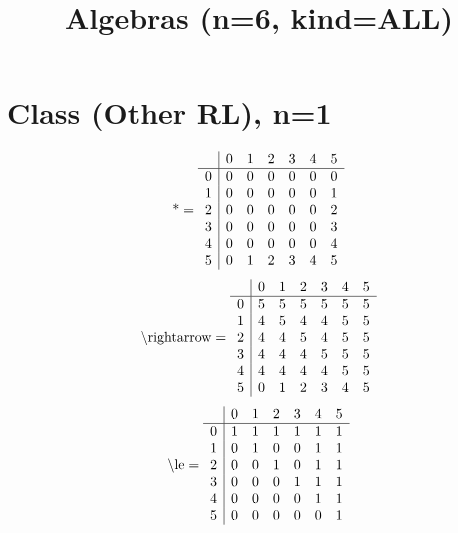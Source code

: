 \documentclass[11pt]{article}
\title{Algebras (n=6, kind=ALL)}
\date{}
\begin{document}
\maketitle
\tableofcontents
\section{Class (Other RL), n=1}
\[\text{*} = 
\begin{array}{r | r r r r r r}
 & 0 & 1 & 2 & 3 & 4 & 5 \\ \hline
0 & 0 & 0 & 0 & 0 & 0 & 0 \\
1 & 0 & 0 & 0 & 0 & 0 & 1 \\
2 & 0 & 0 & 0 & 0 & 0 & 2 \\
3 & 0 & 0 & 0 & 0 & 0 & 3 \\
4 & 0 & 0 & 0 & 0 & 0 & 4 \\
5 & 0 & 1 & 2 & 3 & 4 & 5 \\
\end{array}
\]
\[\text{\textbackslash rightarrow} = 
\begin{array}{r | r r r r r r}
 & 0 & 1 & 2 & 3 & 4 & 5 \\ \hline
0 & 5 & 5 & 5 & 5 & 5 & 5 \\
1 & 4 & 5 & 4 & 4 & 5 & 5 \\
2 & 4 & 4 & 5 & 4 & 5 & 5 \\
3 & 4 & 4 & 4 & 5 & 5 & 5 \\
4 & 4 & 4 & 4 & 4 & 5 & 5 \\
5 & 0 & 1 & 2 & 3 & 4 & 5 \\
\end{array}
\]
\[\text{\textbackslash le} = 
\begin{array}{r | r r r r r r}
 & 0 & 1 & 2 & 3 & 4 & 5 \\ \hline
0 & 1 & 1 & 1 & 1 & 1 & 1 \\
1 & 0 & 1 & 0 & 0 & 1 & 1 \\
2 & 0 & 0 & 1 & 0 & 1 & 1 \\
3 & 0 & 0 & 0 & 1 & 1 & 1 \\
4 & 0 & 0 & 0 & 0 & 1 & 1 \\
5 & 0 & 0 & 0 & 0 & 0 & 1 \\
\end{array}
\]
\end{document}
